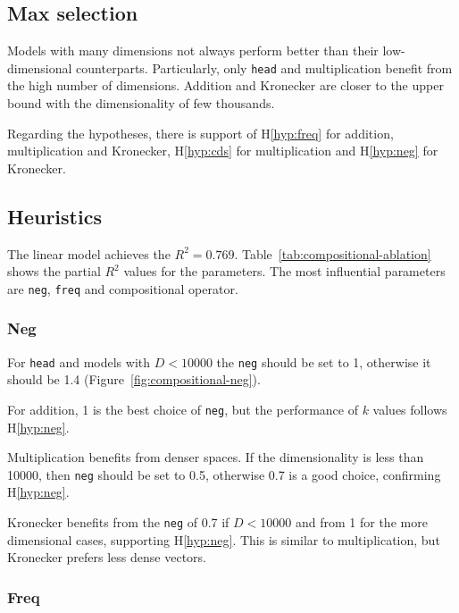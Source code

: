 \subsection{Max selection}
\label{sec:max-selection-compositional}

Models with many dimensions not always perform better than their low-dimensional counterparts. Particularly, only \texttt{head} and multiplication benefit from the high number of dimensions. Addition and Kronecker are closer to the upper bound with the dimensionality of few thousands.

Regarding the hypotheses, there is support of H\ref{hyp:freq} for addition, multiplication and Kronecker, H\ref{hyp:cds} for multiplication and H\ref{hyp:neg} for Kronecker.

\subsection{Heuristics}
\label{sec:heuristics-compositional}

The linear model achieves the $R^2 = 0.769$. Table~\ref{tab:compositional-ablation} shows the partial $R^2$ values for the parameters. The most influential parameters are \texttt{neg}, \texttt{freq} and compositional operator.

\subsubsection{Neg}
\label{sec:neg-compositional}





For \texttt{head} and models with $D < 10000$ the \texttt{neg} should be set to 1, otherwise it should be 1.4 (Figure~\ref{fig:compositional-neg}).

For addition, 1 is the best choice of \texttt{neg}, but the performance of $k$ values follows H\ref{hyp:neg}.

Multiplication benefits from denser spaces. If the dimensionality is less than 10000, then \texttt{neg} should be set to 0.5, otherwise 0.7 is a good choice, confirming H\ref{hyp:neg}.

Kronecker benefits from the \texttt{neg} of 0.7 if $D < 10000$ and from 1 for the more dimensional cases, supporting H\ref{hyp:neg}. This is similar to multiplication, but Kronecker prefers less dense vectors.

\subsubsection{Freq}
\label{sec:freq-compositional}

